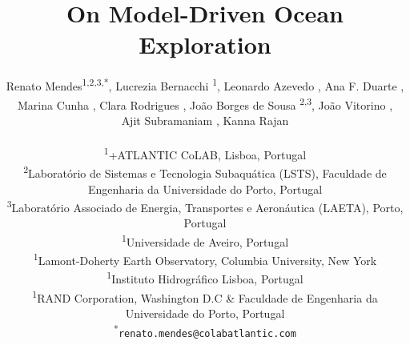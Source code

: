 \documentclass[11pt]{article}
\title{On Model-Driven Ocean Exploration}
\author{
Renato Mendes\textsuperscript{1,2,3,*},
Lucrezia Bernacchi \textsuperscript{1},
Leonardo Azevedo \textsuperscript{},
Ana F. Duarte \textsuperscript{},\\
Marina Cunha \textsuperscript{},
Clara Rodrigues \textsuperscript{},
João Borges de Sousa \textsuperscript{2,3},
João Vitorino \textsuperscript{},\\
Ajit Subramaniam \textsuperscript{},
Kanna Rajan \textsuperscript{}
\\
\\
\textsuperscript{1}{\scriptsize +ATLANTIC CoLAB, Lisboa, Portugal}\\
\textsuperscript{2}{\scriptsize Laboratório de Sistemas e Tecnologia Subaquática (LSTS), Faculdade de Engenharia da Universidade do Porto, Portugal}\\
\textsuperscript{3}{\scriptsize Laboratório Associado de Energia, Transportes e Aeronáutica (LAETA), Porto, Portugal}\\
\textsuperscript{1}{\scriptsize Universidade de Aveiro, Portugal}\\
\textsuperscript{1}{\scriptsize Lamont-Doherty Earth Observatory, Columbia University, New York}\\
\textsuperscript{1}{\scriptsize Instituto Hidrogr{\'a}fico Lisboa, Portugal}\\
\textsuperscript{1}{\scriptsize RAND Corporation, Washington D.C \& Faculdade de Engenharia da Universidade do Porto, Portugal}\\
\textsuperscript{*}\texttt{{\scriptsize renato.mendes@colabatlantic.com}}
}
\date{}
\begin{document}

\maketitle








\footnotesize{
  
}
\end{document}
